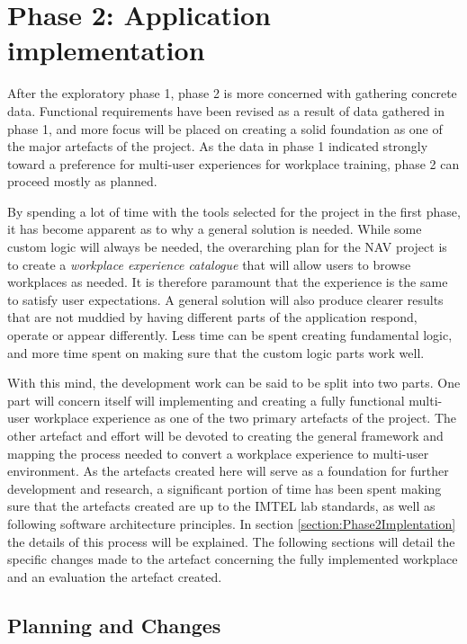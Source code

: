 
\chapter{Phase 2:  Application implementation}
\label{chap:phase2}

After the exploratory phase 1, phase 2 is more concerned with gathering concrete data. Functional requirements have been revised as a result of data gathered in phase 1, and more focus will be placed on creating a solid foundation as one of the major artefacts of the project. As the data in phase 1 indicated strongly toward a preference for multi-user experiences for workplace training, phase 2 can proceed mostly as planned.

By spending a lot of time with the tools selected for the project in the first phase, it has become apparent as to why a general solution is needed. While some custom logic will always be needed, the overarching plan for the NAV project is to create a \textit{workplace experience catalogue} that will allow users to browse workplaces as needed. It is therefore paramount that the experience is the same to satisfy user expectations. A general solution will also produce clearer results that are not muddied by having different parts of the application respond, operate or appear differently. Less time can be spent creating fundamental logic, and more time spent on making sure that the custom logic parts work well.

With this mind, the development work can be said to be split into two parts. One part will concern itself will implementing and creating a fully functional multi-user workplace experience as one of the two primary artefacts of the project. The other artefact and effort will be devoted to creating the general framework and mapping the process needed to convert a workplace experience to multi-user environment. As the artefacts created here will serve as a foundation for further development and research, a significant portion of time has been spent making sure that the artefacts created are up to the IMTEL lab standards, as well as following software architecture principles. In section \ref{section:Phase2Implentation} the details of this process will be explained. The following sections will detail the specific changes made to the artefact concerning the fully implemented workplace and an evaluation the artefact created.


\section{Planning and Changes}


